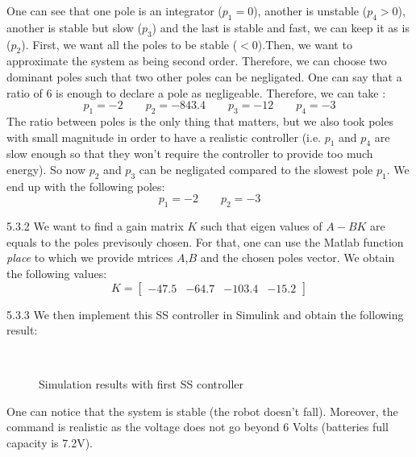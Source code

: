\documentclass[11pt]{article}
\begin{document}
One can see that one pole is an integrator ($p_1=0$), another is unstable ($p_4>0$), another is stable but slow ($p_3$) and the last is stable and fast, we can keep it as is ($p_2$).
First, we want all the poles to be stable ($<0$).Then, we want to approximate the system as being second order. Therefore, we can choose two dominant poles such that two other poles can be negligated. One can say that a ratio of 6 is enough to declare a pole as negligeable. Therefore, we can take :
\begin{equation*}
p_1=-2 \qquad p_2=-843.4 \qquad p_3=-12 \qquad p_4=-3
\end{equation*}
The ratio between poles is the only thing that matters, but we also took poles with small magnitude in order to have a realistic controller (i.e. $p_1$ and $p_4$ are slow enough so that they won't require the controller to provide too much energy).
So now $p_2$ and $p_3$ can be negligated compared to the slowest pole $p_1$. We end up with the following poles:
\begin{equation*}
p_1=-2 \qquad p_2=-3
\end{equation*}

5.3.2 We want to find a gain matrix $K$ such that eigen values of $A-BK$ are equals to the poles previsouly chosen. For that, one can use the Matlab function \emph{place} to which we provide mtrices $A$,$B$ and the chosen poles vector. We obtain the following values:
\begin{equation*}
K=
\begin{bmatrix}
-47.5 & -64.7 & -103.4 & -15.2
\end{bmatrix}
\end{equation*}

5.3.3 We then implement this SS controller in Simulink and obtain the following result:
\begin{figure}[H]
  \\
  \caption{Simulation results with first SS controller}
  \label{fig:fig2}
\end{figure}
One can notice that the system is stable (the robot doesn't fall). Moreover, the command is realistic as the voltage does not go beyond 6 Volts (batteries full capacity is 7.2V).


\end{document}
